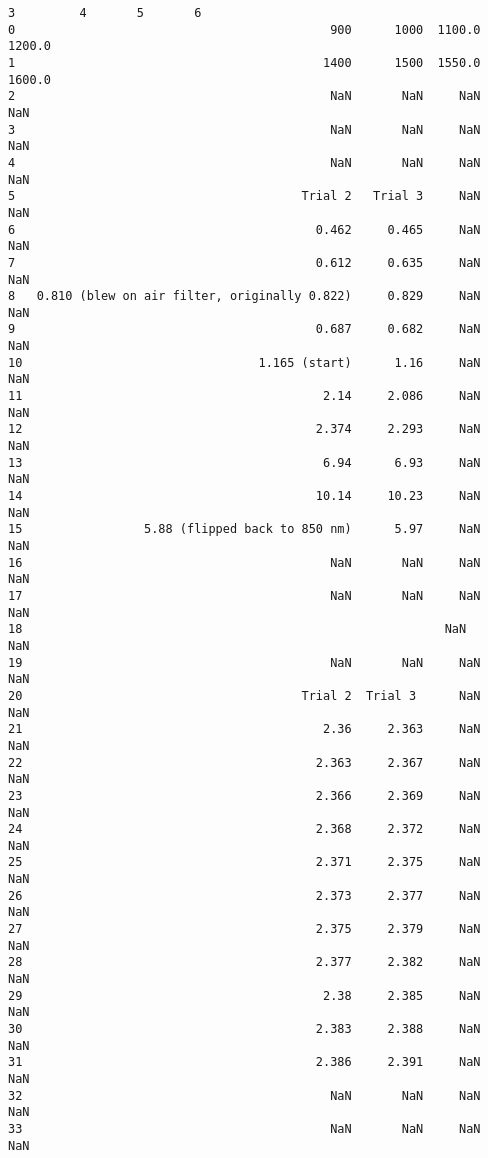 \documentclass[11pt]{article}
\begin{document}
\begin{tcolorbox}[breakable, size=fbox, boxrule=.5pt, pad at break*=1mm, opacityfill=0]
\begin{Verbatim}[commandchars=\\\{\}]
                                               3         4       5       6
0                                            900      1000  1100.0  1200.0
1                                           1400      1500  1550.0  1600.0
2                                            NaN       NaN     NaN     NaN
3                                            NaN       NaN     NaN     NaN
4                                            NaN       NaN     NaN     NaN
5                                        Trial 2   Trial 3     NaN     NaN
6                                          0.462     0.465     NaN     NaN
7                                          0.612     0.635     NaN     NaN
8   0.810 (blew on air filter, originally 0.822)     0.829     NaN     NaN
9                                          0.687     0.682     NaN     NaN
10                                 1.165 (start)      1.16     NaN     NaN
11                                          2.14     2.086     NaN     NaN
12                                         2.374     2.293     NaN     NaN
13                                          6.94      6.93     NaN     NaN
14                                         10.14     10.23     NaN     NaN
15                 5.88 (flipped back to 850 nm)      5.97     NaN     NaN
16                                           NaN       NaN     NaN     NaN
17                                           NaN       NaN     NaN     NaN
18                                             ﻿         ﻿     NaN     NaN
19                                           NaN       NaN     NaN     NaN
20                                       Trial 2  Trial 3      NaN     NaN
21                                          2.36     2.363     NaN     NaN
22                                         2.363     2.367     NaN     NaN
23                                         2.366     2.369     NaN     NaN
24                                         2.368     2.372     NaN     NaN
25                                         2.371     2.375     NaN     NaN
26                                         2.373     2.377     NaN     NaN
27                                         2.375     2.379     NaN     NaN
28                                         2.377     2.382     NaN     NaN
29                                          2.38     2.385     NaN     NaN
30                                         2.383     2.388     NaN     NaN
31                                         2.386     2.391     NaN     NaN
32                                           NaN       NaN     NaN     NaN
33                                           NaN       NaN     NaN     NaN

\end{Verbatim}
\end{tcolorbox}
\end{document}
